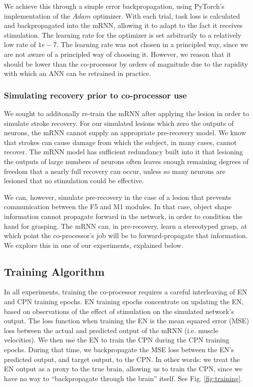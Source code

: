 \documentclass[12pt]{iopart}
\begin{document}
We achieve this through a simple error backpropagation, using PyTorch's
implementation of the $Adam$ optimizer. With each trial, task loss is
calculated and backpropagated into the mRNN, allowing it to adapt to
the fact it receives stimulation. The learning rate for the optimizer
is set arbitrarily to a relatively low rate of $1e-7$. The learning
rate was not chosen in a principled way, since we are not aware of a
principled way of choosing it. However, we reason that it should be
lower than the co-processor by orders of magnitude due
to the rapidity with which an ANN can be retrained in practice.

\subsubsection{Simulating recovery prior to co-processor use}
We sought to additonally re-train the mRNN after applying the lesion in
order to simulate stroke recovery. For our simulated lesions which zero
the outputs of neurons, the mRNN cannot supply an appropriate pre-recovery model.
We know that strokes can cause damage from which the subject, in many cases,
cannot recover. The mRNN model has sufficient redundancy built into it that
lesioning the outputs of large numbers of neurons often leaves enough remaining
degrees of freedom that a nearly full recovery can occur, unless so many
neurons are lesioned that no stimulation could be effective.

We can, however, simulate pre-recovery in the case of a lesion that prevents
communication between the F5 and M1 modules. In that case, object shape information
cannot propagate forward in the network, in order to condition the hand for
grasping. The mRNN can, in pre-recovery, learn a stereotyped grasp, at which
point the co-processor's job will be to forward-propagate that information.
We explore this in one of our experiments, explained below.

\subsection{Training Algorithm}
In all experiments, training the co-processor requires a careful interleaving of
EN and CPN training epochs. EN training epochs concentrate on updating the EN,
based on observations of the effect of stimulation on the simulated network's output.
The loss function when training the EN is the mean squared error (MSE) loss between the
actual and predicted output of the mRNN (i.e. muscle velocities). We then use the EN
to train the CPN during the CPN training epochs. During that time, we backpropagate
the MSE loss between the EN's predicted output, and target output, to the CPN. In
other words: we treat the EN output as a proxy to the true brain, allowing us
to train the CPN, since we have no way to ``backpropagate through the brain'' itself.
See Fig. \ref{fig:training}.
\end{document}
